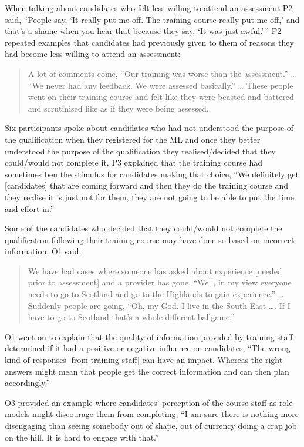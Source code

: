 \documentclass[a4paper,]{book}
\begin{document}
When talking about candidates who felt less willing to attend an assessment P2 said, ``People say, `It really put me off. The training course really put me off,' and that's a shame when you hear that because they say, `It was just awful.'\,'' P2 repeated examples that candidates had previously given to them of reasons they had become less willing to attend an assessment:

\begin{quote}
A lot of comments come, ``Our training was worse than the assessment.'' \ldots{} ``We never had any feedback. We were assessed basically.'' \ldots{} These people went on their training course and felt like they were beasted and battered and scrutinised like as if they were being assessed.
\end{quote}

Six participants spoke about candidates who had not understood the purpose of the qualification when they registered for the ML and once they better understood the purpose of the qualification they realised/decided that they could/would not complete it. P3 explained that the training course had sometimes ben the stimulus for candidates making that choice, ``We definitely get {[}candidates{]} that are coming forward and then they do the training course and they realise it is just not for them, they are not going to be able to put the time and effort in.''

Some of the candidates who decided that they could/would not complete the qualification following their training course may have done so based on incorrect information. O1 said:

\begin{quote}
We have had cases where someone has asked about experience {[}needed prior to assessment{]} and a provider has gone, ``Well, in my view everyone needs to go to Scotland and go to the Highlands to gain experience.'' \ldots{} Suddenly people are going, ``Oh, my God. I live in the South East \ldots{}. If I have to go to Scotland that's a whole different ballgame.''
\end{quote}

O1 went on to explain that the quality of information provided by training staff determined if it had a positive or negative influence on candidates, ``The wrong kind of responses {[}from training staff{]} can have an impact. Whereas the right answers might mean that people get the correct information and can then plan accordingly.''

O3 provided an example where candidates' perception of the course staff as role models might discourage them from completing, ``I am sure there is nothing more disengaging than seeing somebody out of shape, out of currency doing a crap job on the hill. It is hard to engage with that.''
\end{document}
